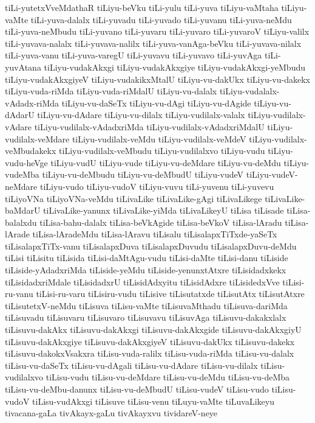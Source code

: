 {tiLi-yutetxVveMdathaR
tiLiyu-beVku
tiLi-yulu
tiLi-yuva
tiLiyu-vaMtaha
tiLiyu-vaMte
tiLi-yuva-dalalx
tiLi-yuvadu
tiLi-yuvado
tiLi-yuvanu
tiLi-yuva-neMdu
tiLi-yuva-neMbudu
tiLi-yuvano
tiLi-yuvaru
tiLi-yuvaro
tiLi-yuvaroV
tiLiyu-valilx
tiLi-yuvava-nalalx
tiLi-yuvava-nalilx
tiLi-yuva-vanAga-beVku
tiLi-yuvava-nilalx
tiLi-yuva-vanu
tiLi-yuva-varegU
tiLi-yuvavu
tiLi-yuvavo
tiLi-yuvAga
tiLi-yuvAtana
tiLiyu-vudakAkxgi
tiLiyu-vudakAkxgiye
tiLiyu-vudakAkxgi-yeMbudu
tiLiyu-vudakAkxgiyeV
tiLiyu-vudakikxMtalU
tiLiyu-vu-dakUkx
tiLiyu-vu-dakekx
tiLiyu-vuda-riMda
tiLiyu-vuda-riMdalU
tiLiyu-vu-dalalx
tiLiyu-vudalalx-vAdadx-riMda
tiLiyu-vu-daSeTx
tiLiyu-vu-dAgi
tiLiyu-vu-dAgide
tiLiyu-vu-dAdarU
tiLiyu-vu-dAdare
tiLiyu-vu-dilalx
tiLiyu-vudilalx-valalx
tiLiyu-vudilalx-vAdare
tiLiyu-vudilalx-vAdadxriMda
tiLiyu-vudilalx-vAdadxriMdalU
tiLiyu-vudilalx-veMdare
tiLiyu-vudilalx-veMdu
tiLiyu-vudilalx-veMdeV
tiLiyu-vudilalx-veMbudakekx
tiLiyu-vudilalx-veMbudu
tiLiyu-vudilalxvo
tiLiyu-vudu
tiLiyu-vudu-heVge
tiLiyu-vudU
tiLiyu-vude
tiLiyu-vu-deMdare
tiLiyu-vu-deMdu
tiLiyu-vudeMba
tiLiyu-vu-deMbudu
tiLiyu-vu-deMbudU
tiLiyu-vudeV
tiLiyu-vudeV-neMdare
tiLiyu-vudo
tiLiyu-vudoV
tiLiyu-vuvu
tiLi-yuvenu
tiLi-yuvevu
tiLiyoVNa
tiLiyoVNa-veMdu
tiLivaLike
tiLivaLike-gAgi
tiLivaLikege
tiLivaLike-baMdarU
tiLivaLike-yanunx
tiLivaLike-yiMda
tiLivaLikeyU
tiLisa
tiLisade
tiLisa-balalxdu
tiLisa-bahu-dalalx
tiLisa-beVkAgide
tiLisa-beVkoV
tiLisa-lAradu
tiLisa-lArade
tiLisa-lAradeMdu
tiLisa-lAravu
tiLisalu
tiLisalapxTiTxde-yaSeTx
tiLisalapxTiTx-vanu
tiLisalapxDuva
tiLisalapxDuvudu
tiLisalapxDuvu-deMdu
tiLisi
tiLisitu
tiLisida
tiLisi-daMtAgu-vudu
tiLisi-daMte
tiLisi-danu
tiLiside
tiLiside-yAdadxriMda
tiLiside-yeMdu
tiLiside-yenunxtAtxre
tiLisidadxkekx
tiLisidadxriMdale
tiLisidadxrU
tiLisidAdxyitu
tiLisidAdxre
tiLisidedxVve
tiLisi-ru-vanu
tiLisi-ru-varu
tiLisiru-vudu
tiLisive
tiLisutatxde
tiLisutAtx
tiLisutAtxre
tiLisutetxV-neMdu
tiLisuva
tiLisu-vaMte
tiLisuvaMthadu
tiLisuva-dariMda
tiLisuvadu
tiLisuvaru
tiLisuvaro
tiLisuvavu
tiLisuvAga
tiLisuvu-dakakxlalx
tiLisuvu-dakAkx
tiLisuvu-dakAkxgi
tiLisuvu-dakAkxgide
tiLisuvu-dakAkxgiyU
tiLisuvu-dakAkxgiye
tiLisuvu-dakAkxgiyeV
tiLisuvu-dakUkx
tiLisuvu-dakekx
tiLisuvu-dakokxVsakxra
tiLisu-vuda-ralilx
tiLisu-vuda-riMda
tiLisu-vu-dalalx
tiLisu-vu-daSeTx
tiLisu-vu-dAgali
tiLisu-vu-dAdare
tiLisu-vu-dilalx
tiLisu-vudilalxvo
tiLisu-vudu
tiLisu-vu-deMdare
tiLisu-vu-deMdu
tiLisu-vu-deMba
tiLisu-vu-deMbu-danunx
tiLisu-vu-deMbudU
tiLisu-vudeV
tiLisu-vudo
tiLisu-vudoV
tiLisu-vudAkxgi
tiLisuve
tiLisu-venu
tiLuyu-vaMte
tiLuvaLikeyu
tivacana-gaLa
tivAkayx-gaLu
tivAkayxvu
tividareV-neye
}
